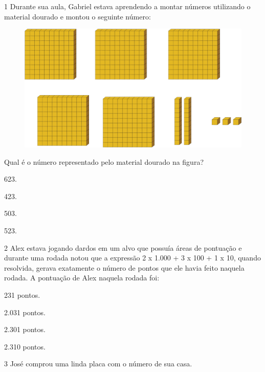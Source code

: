 
\num{1} Durante sua aula, Gabriel estava aprendendo a montar números utilizando o
material dourado e montou o seguinte número:

\begin{figure}[htpb!]
\centering
\includegraphics[width=\textwidth]{./media/image91.png}
\end{figure}

Qual é o número representado pelo material dourado na figura?

\begin{escolha}
\item
  623.
\item
  423.
\item
  503.
\item
  523.
\end{escolha}


\num{2} Alex estava jogando dardos em um alvo que possuía áreas de pontuação e
durante uma rodada notou que a expressão 2 x 1.000 + 3 x 100 + 1 x 10,
quando resolvida, gerava exatamente o número de pontos que ele havia
feito naquela rodada. A pontuação de Alex naquela rodada foi:

\begin{multicols}{2}
\begin{escolha}
\item
  231 pontos.
\item
  2.031 pontos.
\item
  2.301 pontos.
\item
  2.310 pontos.
\end{escolha}
\end{multicols}

\pagebreak
\num{3} José comprou uma linda placa com o número de sua casa.

